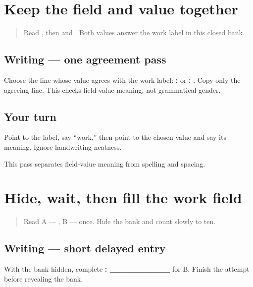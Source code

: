 \section[\texorpdfstring{\pa{ਕੰਮ}: \pa{ਨੌਕਰੀ} (work field and …)}{ਕੰਮ: ਨੌਕਰੀ (work field and …)}]{Keep the field and value together}

\label{lesson:PA-W05-work-agreement}



\begin{quote}
Read \textbf{}, then \textbf{} and \textbf{}. Both values answer the work label in this closed bank.
\end{quote}

\subsection*{Writing — one agreement pass}
Choose the line whose value agrees with the work label: \textbf{: } or \textbf{: }. Copy only the agreeing line. This checks field-value meaning, not grammatical gender.

\subsection*{Your turn}
Point to the label, say “work,” then point to the chosen value and say its meaning. Ignore handwriting neatness.

\begin{tcolorbox}[breakable,colback=teal!4,colframe=teal!35!black,title={Before you move on}]
This pass separates field-value meaning from spelling and spacing.
\end{tcolorbox}
\section[\texorpdfstring{\pa{ਕੰਮ}: \_\_\_\_\_\_\_\_\_\_ (work field after …)}{ਕੰਮ: \_\_\_\_\_\_\_\_\_\_ (work field after …)}]{Hide, wait, then fill the work field}

\label{lesson:PA-W05-work-delayed}



\begin{quote}
Read A — \textbf{}, B — \textbf{} once. Hide the bank and count slowly to ten.
\end{quote}

\subsection*{Writing — short delayed entry}
With the bank hidden, complete \textbf{: \_\_\_\_\_\_\_\_\_\_} for B. Finish the attempt before revealing the bank.

